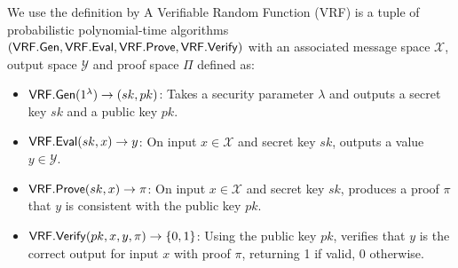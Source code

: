 \begin{definition}
We use the definition by \cite{bitansky_verifiable_2020} A Verifiable Random Function (VRF) is a tuple of probabilistic polynomial-time algorithms $(\mathsf{VRF.Gen}, \mathsf{VRF.Eval}, \mathsf{VRF.Prove}, \mathsf{VRF.Verify})$ with an associated message space $\mathcal{X}$, output space $\mathcal{Y}$ and proof space $\Pi$ defined as:
\begin{itemize}
    \item $\mathsf{VRF.Gen}(1^\lambda) \to (sk, pk)$: Takes a security parameter $\lambda$ and outputs a secret key $sk$ and a public key $pk$.
    
    \item $\mathsf{VRF.Eval}(sk,x) \to y$: On input $x \in \mathcal{X}$ and secret key $sk$, outputs a value $y \in \mathcal{Y}$.
    
    \item $\mathsf{VRF.Prove}(sk,x) \to \pi$: On input $x \in \mathcal{X}$ and secret key $sk$, produces a proof $\pi$ that $y$ is consistent with the public key $pk$.
    
    \item $\mathsf{VRF.Verify}(pk,x, y, \pi) \to \{0,1\}$: Using the public key $pk$, verifies that $y$ is the correct output for input $x$ with proof $\pi$, returning 1 if valid, 0 otherwise.
\end{itemize}
    
\end{definition}

